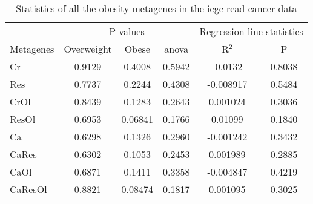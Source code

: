\begin{appendices}
\begin{table}[htpb]
	\centering
	\caption[Statistics of all the obesity metagenes in the \gls{icgc} \acrshort{read} cancer data]{Statistics of all the obesity metagenes in the \gls{icgc} \gls{read} cancer data}
	\label{tab:degmetaread}
	\begin{threeparttable}
		\begin{tabular}{lccccc}
			& \multicolumn{3}{c}{ P-values} & \multicolumn{2}{c}{ Regression line statistics}\\
			\cmidrule(r){2-4} \cmidrule(r){5-6}
			Metagenes &  Overweight &  Obese &  \gls{anova} &  R$^2$ &  P \\
			\hline
			\hline
			\rule{0pt}{2.25ex}Cr      & 0.9129                      & 0.4008  & 0.5942             & -0.0132    & 0.8038              \\
			Res     & 0.7737                      & 0.2244  & 0.4308             & -0.008917  & 0.5484              \\
			CrOl    & 0.8439                      & 0.1283  & 0.2643             & 0.001024   & 0.3036              \\
			ResOl   & 0.6953                      & 0.06841 & 0.1766             & 0.01099    & 0.1840              \\
			Ca      & 0.6298                      & 0.1326  & 0.2960             & -0.001242  & 0.3432              \\
			CaRes   & 0.6302                      & 0.1053  & 0.2453             & 0.001989   & 0.2885              \\
			CaOl    & 0.6871                      & 0.1411  & 0.3358             & -0.004847  & 0.4219              \\
			CaResOl & 0.8821                      & 0.08474 & 0.1817             & 0.001095   & 0.3025              \\
			\hline
			\hline
		\end{tabular}
	\end{threeparttable}
\end{table}


\end{appendices}
